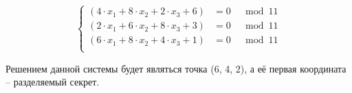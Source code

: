 \[ \left\{\begin{align}
   \left( 4\cdot x_1 + 8\cdot x_2 + 2\cdot x_3 + 6 \right) &= 0 &\mod 11  \\
   \left( 2\cdot x_1 + 6\cdot x_2 + 8\cdot x_3 + 3 \right) &= 0 &\mod 11  \\
   \left( 6\cdot x_1 + 8\cdot x_2 + 4\cdot x_3 + 1 \right) &= 0 &\mod 11  \\
\end{align} \right. \]

Решением данной системы будет являться точка (6, 4, 2), а её первая координата -- разделяемый секрет.
\exampleend

